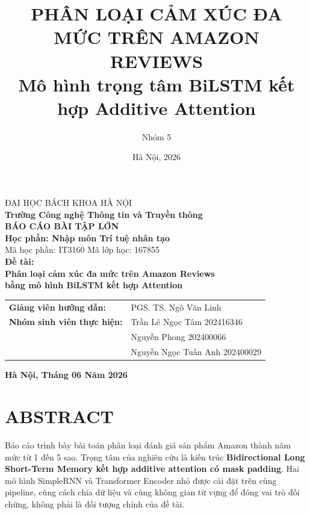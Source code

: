 \documentclass[12pt]{report}
\title{\textbf{PHÂN LOẠI CẢM XÚC ĐA MỨC TRÊN AMAZON REVIEWS}\\
\large Mô hình trọng tâm BiLSTM kết hợp Additive Attention}
\author{Nhóm 5}
\date{Hà Nội, 2026}
\begin{document}
\begin{titlepage}
\begin{center}
{\fontsize{14pt}{1}\selectfont ĐẠI HỌC BÁCH KHOA HÀ NỘI} \\[0.2cm]
{\fontsize{14pt}{1}\selectfont \textbf{Trường Công nghệ Thông tin và Truyền thông}} \\[1.5cm]

{\fontsize{18pt}{1}\selectfont \textbf{BÁO CÁO BÀI TẬP LỚN}} \\[0.3cm]
{\fontsize{16pt}{1}\selectfont \textbf{Học phần: Nhập môn Trí tuệ nhân tạo}} \\[0.5cm]
Mã học phần: IT3160 \hspace{0.5cm} Mã lớp học: 167855 \\[2.5cm]

{\fontsize{16pt}{1}\selectfont \textbf{Đề tài:}} \\[0.5cm]
{\fontsize{20pt}{1.2}\selectfont \textbf{Phân loại cảm xúc đa mức trên Amazon Reviews\\ bằng mô hình BiLSTM kết hợp Attention}} \\[2.5cm]

\begin{tabular}{ll}
\textbf{Giảng viên hướng dẫn:} & PGS. TS. Ngô Văn Linh \\
\textbf{Nhóm sinh viên thực hiện:} & Trần Lê Ngọc Tâm \hspace{0.5cm} 202416346 \\
& Nguyễn Phong \hspace{1.15cm} 202400066 \\
& Nguyễn Ngọc Tuấn Anh \hspace{0.2cm} 202400029 \\
\end{tabular}

\vfill
{\fontsize{14pt}{1}\selectfont \textbf{Hà Nội, Tháng 06 Năm 2026}}
\end{center}
\end{titlepage}


\tableofcontents
\listoffigures
\listoftables



\chapter*{ABSTRACT}

Báo cáo trình bày bài toán phân loại đánh giá sản phẩm Amazon thành năm mức từ
1 đến 5 sao. Trọng tâm của nghiên cứu là kiến trúc \textbf{Bidirectional Long
Short-Term Memory kết hợp additive attention có mask padding}. Hai mô hình
SimpleRNN và Transformer Encoder nhỏ được cài đặt trên cùng pipeline, cùng cách
chia dữ liệu và cùng không gian từ vựng để đóng vai trò đối chứng, không phải là
đối tượng chính của đề tài.
\end{document}
